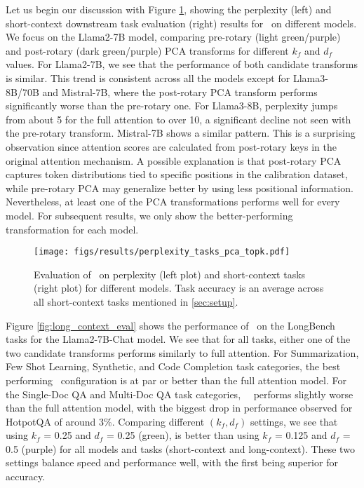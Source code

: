 Let us begin our discussion with Figure \ref{fig:all_model_eval}, showing the
perplexity (left) and short-context downstream task evaluation (right) results
for \method~on different models.
We focus on the Llama2-7B model, comparing pre-rotary (light green/purple)
and post-rotary (dark green/purple) PCA transforms for different $k_f$ and
$d_f$ values. For Llama2-7B, we see that the performance of both candidate
transforms is similar. This trend is consistent across all the models except
for Llama3-8B/70B and Mistral-7B, where the post-rotary PCA transform performs
significantly worse than the pre-rotary one. For Llama3-8B, perplexity jumps
from about 5 for the full attention to over 10, a significant decline not seen
with the pre-rotary transform. Mistral-7B shows a similar pattern. This is a
surprising observation since attention scores are calculated from post-rotary
keys in the original attention mechanism. A possible explanation is that 
post-rotary PCA captures token distributions tied to specific positions in 
the calibration dataset, while pre-rotary PCA may generalize better by using 
less positional information. Nevertheless, at least one of the PCA
transformations performs well for every model. For subsequent results, we only
show the better-performing transformation for each model. 

\begin{figure}[h]
  \centering
    \texttt{[image: figs/results/perplexity\_tasks\_pca\_topk.pdf]}
    \caption{Evaluation of \method~on perplexity (left plot) and short-context tasks (right plot) for different models. 
    Task accuracy is an average across all short-context tasks mentioned in \ref{sec:setup}.}
    \label{fig:all_model_eval}
\end{figure}

Figure \ref{fig:long_context_eval} shows the performance of \method~on the
LongBench tasks for the Llama2-7B-Chat model. We see that for all tasks, either
one of the two candidate transforms performs similarly to full attention. For
Summarization, Few Shot Learning, Synthetic, and Code Completion task
categories, the best performing \method~configuration is at par or better than
the full attention model. For the Single-Doc QA and Multi-Doc QA task
categories, ~\method~performs slightly worse than the full attention model,
with the biggest drop in performance observed for HotpotQA of around 3\%.
Comparing different $(k_f, d_f)$ settings, we see that using $k_f$ = 0.25 and
$d_f$ = 0.25 (green), is better than using $k_f$ = 0.125 and $d_f$ = 0.5
(purple) for all models and tasks (short-context and long-context). These two
settings balance speed and performance well, with the first being superior for
accuracy.

